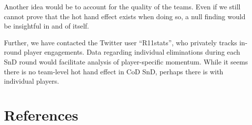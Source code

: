 \documentclass{article}
\begin{document}
Another idea would be to account for the quality of the teams. Even if
we still cannot prove that the hot hand effect exists when doing so, a
null finding would be insightful in and of itself.

Further, we have contacted the Twitter user ``R11stats'', who privately
tracks in-round player engagements. Data regarding individual
eliminations during each SnD round would facilitate analysis of
player-specific momentum. While it seems there is no team-level hot hand
effect in CoD SnD, perhaps there is with individual players.

\hypertarget{references}{%
\section*{References}\label{references}}
\end{document}
